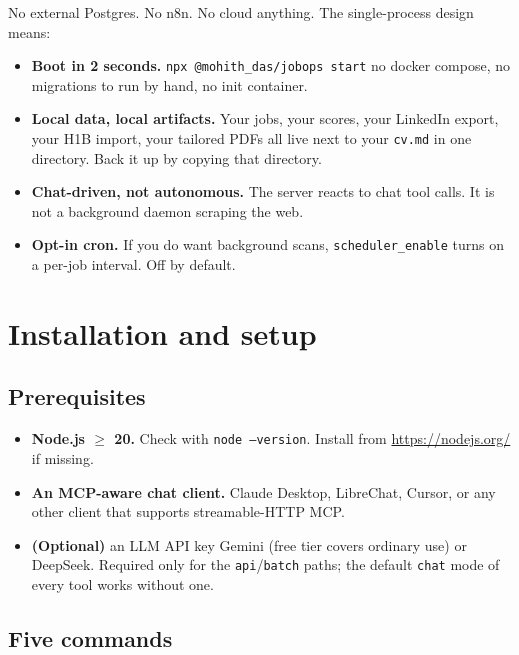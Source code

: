 \documentclass[11pt,letterpaper]{article}
\newcommand{\tool}[1]{\texttt{#1}}
\newcommand{\fpath}[1]{\texttt{#1}}
\newcommand{\cmd}[1]{\texttt{#1}}
\begin{document}
No external Postgres. No n8n. No cloud anything. The single-process design means:

\begin{itemize}
\item \textbf{Boot in 2 seconds.} \cmd{npx @mohith\_das/jobops start} \textemdash{} no docker compose, no migrations to run by hand, no init container.
\item \textbf{Local data, local artifacts.} Your jobs, your scores, your LinkedIn export, your H1B import, your tailored PDFs all live next to your \fpath{cv.md} in one directory. Back it up by copying that directory.
\item \textbf{Chat-driven, not autonomous.} The server reacts to chat tool calls. It is not a background daemon scraping the web.
\item \textbf{Opt-in cron.} If you do want background scans, \tool{scheduler\_enable} turns on a per-job interval. Off by default.
\end{itemize}

\section{Installation and setup}

\subsection*{Prerequisites}

\begin{itemize}
\item \textbf{Node.js \(\ge\) 20.} Check with \cmd{node --version}. Install from \url{https://nodejs.org/} if missing.
\item \textbf{An MCP-aware chat client.} Claude Desktop, LibreChat, Cursor, or any other client that supports streamable-HTTP MCP.
\item \textbf{(Optional)} an LLM API key \textemdash{} Gemini (free tier covers ordinary use) or DeepSeek. Required only for the \texttt{api}/\texttt{batch} paths; the default \texttt{chat} mode of every tool works without one.
\end{itemize}

\subsection*{Five commands}
\end{document}
